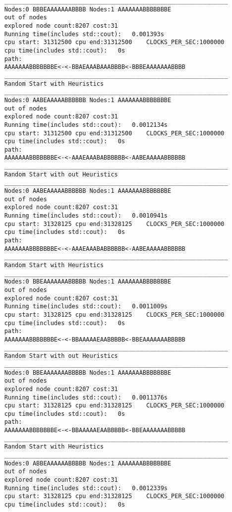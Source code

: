 \documentclass[12pt]{article}
\begin{document}
\begin{lstlisting}
	_______________________________________________________________
	Nodes:0	BBBEAAAAAAABBBB Nodes:1	AAAAAAABBBBBBBE
	out of nodes
	explored node count:8207 cost:31
	Running time(includes std::cout):	0.001393s
	cpu start: 31312500	cpu end:31312500	CLOCKS_PER_SEC:1000000
	cpu time(includes std::cout):	0s
	path:
	AAAAAAABBBBBBBE<-<-BBAEAAABAAABBBB<-BBBEAAAAAAABBBB
	_______________________________________________________________
	Random Start with Heuristics
	_______________________________________________________________
	Nodes:0	AABEAAAAABBBBBB Nodes:1	AAAAAAABBBBBBBE
	out of nodes
	explored node count:8207 cost:31
	Running time(includes std::cout):	0.0012134s
	cpu start: 31312500	cpu end:31312500	CLOCKS_PER_SEC:1000000
	cpu time(includes std::cout):	0s
	path:
	AAAAAAABBBBBBBE<-<-AAAEAAABABBBBBB<-AABEAAAAABBBBBB
	_______________________________________________________________
	Random Start with out Heuristics
	_______________________________________________________________
	Nodes:0	AABEAAAAABBBBBB Nodes:1	AAAAAAABBBBBBBE
	out of nodes
	explored node count:8207 cost:31
	Running time(includes std::cout):	0.0010941s
	cpu start: 31328125	cpu end:31328125	CLOCKS_PER_SEC:1000000
	cpu time(includes std::cout):	0s
	path:
	AAAAAAABBBBBBBE<-<-AAAEAAABABBBBBB<-AABEAAAAABBBBBB
	_______________________________________________________________
	Random Start with Heuristics
	_______________________________________________________________
	Nodes:0	BBEAAAAAAABBBBB Nodes:1	AAAAAAABBBBBBBE
	out of nodes
	explored node count:8207 cost:31
	Running time(includes std::cout):	0.0011009s
	cpu start: 31328125	cpu end:31328125	CLOCKS_PER_SEC:1000000
	cpu time(includes std::cout):	0s
	path:
	AAAAAAABBBBBBBE<-<-BBAAAAAEAABBBBB<-BBEAAAAAAABBBBB
	_______________________________________________________________
	Random Start with out Heuristics
	_______________________________________________________________
	Nodes:0	BBEAAAAAAABBBBB Nodes:1	AAAAAAABBBBBBBE
	out of nodes
	explored node count:8207 cost:31
	Running time(includes std::cout):	0.0011376s
	cpu start: 31328125	cpu end:31328125	CLOCKS_PER_SEC:1000000
	cpu time(includes std::cout):	0s
	path:
	AAAAAAABBBBBBBE<-<-BBAAAAAEAABBBBB<-BBEAAAAAAABBBBB
	_______________________________________________________________
	Random Start with Heuristics
	_______________________________________________________________
	Nodes:0	ABBEAAAAAABBBBB Nodes:1	AAAAAAABBBBBBBE
	out of nodes
	explored node count:8207 cost:31
	Running time(includes std::cout):	0.0012339s
	cpu start: 31328125	cpu end:31328125	CLOCKS_PER_SEC:1000000
	cpu time(includes std::cout):	0s

\end{lstlisting}
\end{document}
